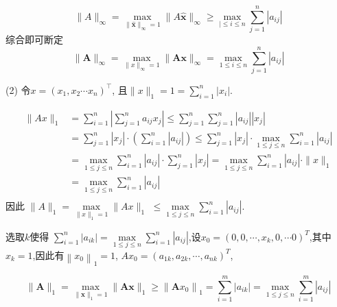 $$\|A\|_{\infty}=\max _{\| \hat{\boldsymbol{x}}\|_{\infty}=1}\|A  \hat{\boldsymbol{x}}\|_{\infty} \geqslant \max _{\mid \leqslant i \leqslant n} \sum_{j=1}^{n}\left|a_{i j}\right|$$
综合即可断定
$$
\|\boldsymbol{A}\|_{\infty}=\max _{\|x\|_{\infty}=1}\|\boldsymbol{A} \boldsymbol{x}\|_{\infty}=\max _{1 \leqslant i \leqslant n} \sum_{j=1}^{n}\left|a_{i j}\right|
$$

(2) 令$ x=\left(x_{1}, x_{2} \cdots x_{n}\right)^{\top}$, 且$\|x\|_{1}=1=\sum\limits_{i=1}^{n}\left|x_{i}\right|$.

$$
\begin{aligned}
\|A x\|_{1}&=\sum_{i=1}^{n}\left|\sum_{j=1}^{n} a_{i j} x_{j}\right| \leqslant \sum_{j=1}^{n} \sum_{j=1}^{n}\left|a_{i j}\right|\left|x_{j}\right| \\
&=\sum_{j=1}^{n}\left|x_{j}\right| \cdot\left(\sum_{i=1}^{n}\left|a_{i j}\right|\right) \leqslant \sum_{j=1}^{n}\left|x_{j}\right| \cdot \max _{1 \leqslant j \leqslant n} \sum_{i=1}^{n}\left|a_{i j}\right| \\
&=\max _{1 \leqslant j \leqslant n} \sum_{i=1}^{n}\left|a_{i j}\right| \cdot \sum_{j=1}^{n}\left|x_{j}\right| =\max _{1 \leqslant j \leqslant n} \sum_{i=1}^{n}\left|a_{i j}\right| \cdot\|x\|_{1} \\
&=\max _{1 \leqslant j \leqslant n} \sum_{i=1}^{n}\left|a_{i j}\right| \\
\end{aligned}
$$
因此 $ \|A\|_{1}=\max\limits _{\|x\|_{1}=1}\|A x\|_{1} $
$ \leqslant \max\limits _{1 \leqslant j \leqslant n} \sum\limits_{i=1}^{n}\left|a_{i j}\right|$. 

选取$k$使得 $ \sum\limits_{i=1}^{n}\left|a_{i k}\right|= \max\limits _{1 \leqslant j \leqslant n} \sum\limits_{i=1}^{n}\left|a_{i j}\right| $,设$x_0=(0,0,\cdots,x_k,0,\cdots 0)^T$,其中$x_k=1$,因此有$\left\|x_{0}\right\|_{1}=1 $,  $A x_{0}=\left(a_{1 k}, a_{2 k}, \cdots, a_{n k}\right)^{T}$,


$$ \|\boldsymbol{A}\|_{1}=\max _{\|\boldsymbol{x}\|_{1}=1}\|\boldsymbol{A} \boldsymbol{x}\|_{1} \geqslant\left\|\boldsymbol{A} x_{0}\right\|_{1}=\sum_{i=1}^{m}\left|a_{i k}\right|=\max _{1\leqslant j\leqslant n} \sum_{i=1}^{m}\left|a_{i j}\right| $$

